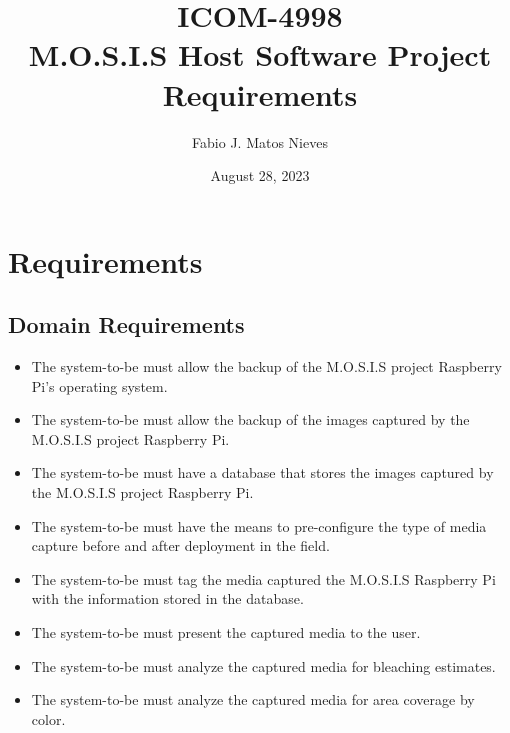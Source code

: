\documentclass{article}
\title{ICOM-4998\\ M.O.S.I.S Host Software Project Requirements}
\author{Fabio J. Matos Nieves}
\date{August 28, 2023}
\begin{document}
\maketitle
\section{Requirements}
\subsection{Domain Requirements}
\begin{itemize}
 \item The system-to-be must allow the backup of the M.O.S.I.S project Raspberry Pi's operating system.
 \item The system-to-be must allow the backup of the images captured by the M.O.S.I.S project Raspberry Pi.
 \item The system-to-be must have a database that stores the images captured by the M.O.S.I.S project Raspberry Pi.
 \item The system-to-be must have the means to pre-configure the type of media capture before and after deployment in the field.
 \item The system-to-be must tag the media captured the M.O.S.I.S Raspberry Pi with the information stored in the database.
 \item The system-to-be must present the captured media to the user.
 \item The system-to-be must analyze the captured media for bleaching estimates.
 \item The system-to-be must analyze the captured media for area coverage by color.
\end{itemize}
\end{document}
